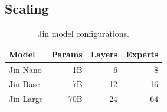 \subsection{Scaling}

\begin{table}[h]
\centering
\caption{Jin model configurations.}
\label{tab:scale}
\begin{tabular}{lrrr}
\toprule
\textbf{Model} & \textbf{Params} & \textbf{Layers} & \textbf{Experts} \\
\midrule
Jin-Nano & 1B & 6 & 8 \\
Jin-Base & 7B & 12 & 16 \\
Jin-Large & 70B & 24 & 64 \\
\bottomrule
\end{tabular}
\end{table}

